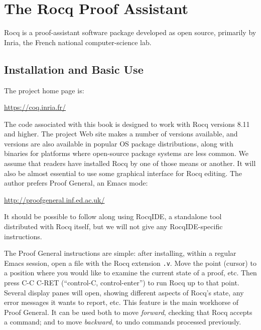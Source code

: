 \documentclass{amsbook}
\theoremstyle{definition}
\theoremstyle{remark}
\numberwithin{section}{chapter}
\numberwithin{equation}{chapter}
\begin{document}

\appendix


\chapter{\label{coqref}The Rocq Proof Assistant}

Rocq is a proof-assistant software package developed as open source, primarily by Inria, the French national computer-science lab.

\section{Installation and Basic Use}

The project home page is:
\begin{center}
  \url{https://coq.inria.fr/}
\end{center}
The code associated with this book is designed to work with Rocq versions 8.11 and higher.
The project Web site makes a number of versions available, and versions are also available in popular OS package distributions, along with binaries for platforms where open-source package systems are less common.
We assume that readers have installed Rocq by one of those means or another.
It will also be almost essential to use some graphical interface for Rocq editing.
The author prefers Proof General, an Emacs mode:
\begin{center}
  \url{http://proofgeneral.inf.ed.ac.uk/}
\end{center}
It should be possible to follow along using RocqIDE, a standalone tool distributed with Rocq itself, but we will not give any RocqIDE-specific instructions.

The Proof General instructions are simple: after installing, within a regular Emacs session, open a file with the Rocq extension \texttt{.v}.
Move the point (cursor) to a position where you would like to examine the current state of a proof, etc.
Then press C-C C-RET (``control-C, control-enter'') to run Rocq up to that point.
Several display panes will open, showing different aspects of Rocq's state, any error messages it wants to report, etc.
This feature is the main workhorse of Proof General.
It can be used both to move \emph{forward}, checking that Rocq accepts a command; and to move \emph{backward}, to undo commands processed previously.
\end{document}
